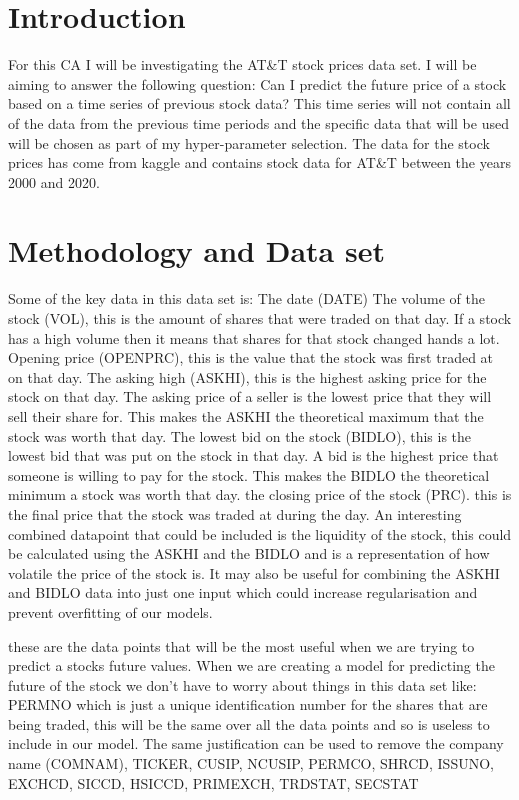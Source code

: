 \documentclass{report}
\begin{document}
\section{Introduction}
For this CA I will be investigating the AT\&T stock prices data set.
I will be aiming to answer the following question: Can I predict the future price of a stock based on a time series of previous stock data?
This time series will not contain all of the data from the previous time periods and the specific data that will be used will be chosen as part of my hyper-parameter selection.
The data for the stock prices has come from kaggle and contains stock data for AT\&T between the years 2000 and 2020.

\section{Methodology and Data set}
Some of the key data in this data set is: The date (DATE)
The volume of the stock (VOL), this is the amount of shares that were traded on that day. If a stock has a high volume then it means that shares for that stock changed hands a lot.
Opening price (OPENPRC), this is the value that the stock was first traded at on that day.
The asking high (ASKHI), this is the highest asking price for the stock on that day. The asking price of a seller is the lowest price that they will sell their share for. This makes the ASKHI the theoretical maximum that the stock was worth that day.
The lowest bid on the stock (BIDLO), this is the lowest bid that was put on the stock in that day. A bid is the highest price that someone is willing to pay for the stock. This makes the BIDLO the theoretical minimum a stock was worth that day.
the closing price of the stock (PRC). this is the final price that the stock was traded at during the day.
An interesting combined datapoint that could be included is the liquidity of the stock, this could be calculated using the ASKHI and the BIDLO and is a representation of how volatile the price of the stock is. It may also be useful for combining the ASKHI and BIDLO data into just one input which could increase regularisation and prevent overfitting of our models.

these are the data points that will be the most useful when we are trying to predict a stocks future values.
When we are creating a model for predicting the future of the stock we don't have to worry about things in this data set like:
PERMNO which is just a unique identification number for the shares that are being traded, this will be the same over all the data points and so is useless to include in our model.
The same justification can be used to remove the company name (COMNAM), TICKER, CUSIP, NCUSIP, PERMCO, SHRCD, ISSUNO, EXCHCD, SICCD, HSICCD, PRIMEXCH, TRDSTAT, SECSTAT
\end{document}
